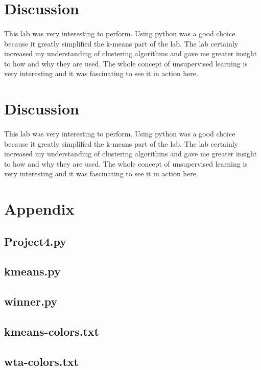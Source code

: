\documentclass{article}
\begin{document}
\section*{Discussion}
\paragraph{}
This lab was very interesting to perform. Using python was a good
choice because it greatly simplified the k-means part of the lab.
The lab certainly increased my understanding of clustering algorithms 
and gave me greater insight to how and why they are used. The whole
concept of unsupervised learning is very interesting and it was fascinating
to see it in action here.
\newpage


\section*{Discussion}
\paragraph{}
This lab was very interesting to perform. Using python was a good
choice because it greatly simplified the k-means part of the lab.
The lab certainly increased my understanding of clustering algorithms 
and gave me greater insight to how and why they are used. The whole
concept of unsupervised learning is very interesting and it was fascinating
to see it in action here.
\newpage


\appendix
\section*{Appendix}
\subsection*{Project4.py}

\newpage
\subsection*{kmeans.py}

\newpage
\subsection*{winner.py}

\newpage
\subsection*{kmeans-colors.txt}

\newpage
\subsection*{wta-colors.txt}

\end{document}

